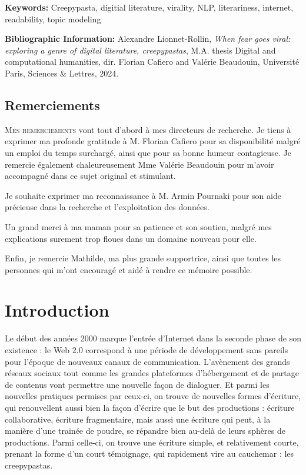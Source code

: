 \documentclass[12pt,a4paper,oneside,titlepage]{book} %
\begin{document}
\medskip

\textbf{Keywords:} Creepypasta, digitial literature, virality, NLP, literariness, internet, readability, topic modeling

\textbf{Bibliographic Information:} Alexandre Lionnet-Rollin, \textit{When fear goes viral: exploring a genre of digital literature, creepypastas}, M.A. thesis \og Digital and computational humanities\fg{}, dir. Florian Cafiero and Valérie Beaudouin, Université Paris, Sciences \& Lettres, 2024.


\clearpage
\thispagestyle{empty}
\cleardoublepage


\section*{Remerciements}

\lettrine{M}{es remerciements} vont tout d'abord à mes directeurs de recherche. Je tiens à exprimer ma profonde gratitude à M. Florian Cafiero pour sa disponibilité malgré un emploi du temps surchargé, ainsi que pour sa bonne humeur contagieuse. Je remercie également chaleureusement Mme Valérie Beaudouin pour m'avoir accompagné dans ce sujet original et stimulant.

Je souhaite exprimer ma reconnaissance à M. Armin Pournaki pour son aide précieuse dans la recherche et l'exploitation des données. 

Un grand merci à ma maman pour sa patience et son soutien, malgré mes explications surement trop floues dans un domaine nouveau pour elle.

Enfin, je remercie Mathilde, ma plus grande supportrice, ainsi que toutes les personnes qui m'ont encouragé et aidé à rendre ce mémoire possible.

\clearpage

\thispagestyle{empty}
\cleardoublepage

\tableofcontents
\newpage
\listoffigures
\listoftables
\newpage
{}
\chapter*{Introduction}

Le début des années 2000 marque l’entrée d’Internet dans la seconde phase de son existence : le Web 2.0 correspond à une période de développement sans pareils pour l’époque de nouveaux canaux de communication. L’avènement des grands réseaux sociaux tout comme les grandes plateformes d’hébergement et de partage de contenus vont permettre une nouvelle façon de dialoguer. Et parmi les nouvelles pratiques permises par ceux-ci, on trouve de nouvelles formes d'écriture, qui renouvellent aussi bien la façon d’écrire que le but des productions : écriture collaborative, écriture fragmentaire, mais aussi une écriture qui peut, à la manière d'une trainée de poudre, se répandre bien au-delà de leurs sphères de productions. Parmi celle-ci, on trouve une écriture simple, et relativement courte, prenant la forme d'un court témoignage, qui rapidement vire au cauchemar : les creepypastas. 
\end{document}
